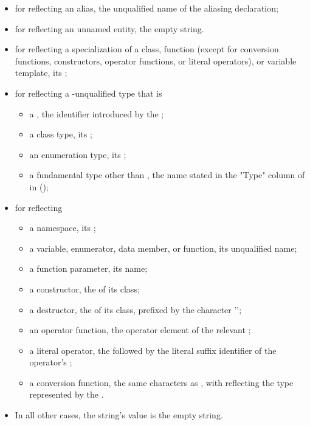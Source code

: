 \begin{std.txt}
\begin{itemdescr}
\begin{itemize}
\item for  reflecting an alias, the unqualified name of the aliasing declaration;
\item for  reflecting an unnamed entity, the empty string.
\item for  reflecting a specialization of a class, function (except for conversion functions, constructors, operator functions, or literal operators), or variable template, its ;
\item for  reflecting a \cv-unqualified type that is
    \begin{itemize}
    \item a , the identifier introduced by the ;
    \item a class type, its ;
    \item an enumeration type, its ;
    \item a fundamental type other than , the name stated in the "Type" column of  in ();
    \end{itemize}
\item for  reflecting
    \begin{itemize}
    \item a namespace, its ;
    \item a variable, enumerator, data member, or function, its unqualified name;
    \item a function parameter, its name;
    \item a constructor, the  of its class;
    \item a destructor, the  of its class, prefixed by the character ’\tilde’;
    \item an operator function, the operator element of the relevant ;
    \item a literal operator, the   followed by the literal suffix identifier of the operator's ;
    \item a conversion function, the same characters as , with  reflecting the type represented by the .
    \end{itemize}
\item In all other cases, the string’s value is the empty string.
\end{itemize}


\end{itemdescr}
\end{std.txt}
